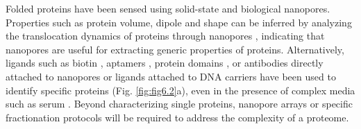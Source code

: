 Folded proteins have been sensed using solid-state \cite{Firnkes2010} and biological \cite{Soskine2012} nanopores. Properties such as protein volume, dipole and shape can be inferred by analyzing the translocation dynamics of proteins through nanopores \cite{Houghtaling2019}, indicating that nanopores are useful for extracting generic properties of proteins. Alternatively, ligands such as biotin \cite{Movileanu2000}, aptamers \cite{Rotem2012}, protein domains \cite{Thakur2019}, or antibodies \cite{Fahie2015} directly attached to nanopores or ligands attached to DNA carriers have been used to identify specific proteins (Fig. \ref{fig:fig6.2}a), even in the presence of complex media such as serum \cite{Chuah2019}. Beyond characterizing single proteins, nanopore arrays or specific fractionation protocols will be required to address the complexity of a proteome.

